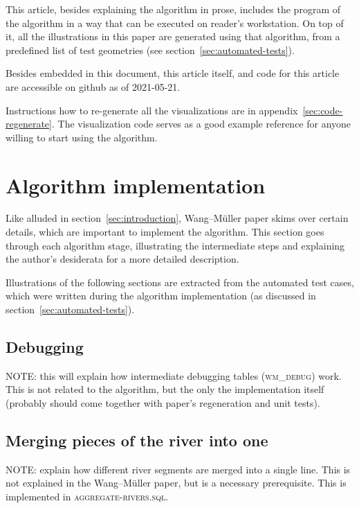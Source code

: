 \documentclass[a4paper]{article}
\newcommand{\WM}{Wang--M{\"u}ller}
\begin{document}
This article, besides explaining the algorithm in prose, includes the program
of the algorithm in a way that can be executed on reader's workstation. On top
of it, all the illustrations in this paper are generated using that algorithm,
from a predefined list of test geometries (see
section~\ref{sec:automated-tests}).

Besides embedded in this document, this article itself, and code for this
article are accessible on github as of 2021-05-21\cite{wmsql}.

Instructions how to re-generate all the visualizations are in
appendix~\ref{sec:code-regenerate}. The visualization code serves as a good
example reference for anyone willing to start using the algorithm.

\section{Algorithm implementation}

Like alluded in section~\ref{sec:introduction}, {\WM} paper skims over
certain details, which are important to implement the algorithm. This section
goes through each algorithm stage, illustrating the intermediate steps and
explaining the author's desiderata for a more detailed description.

Illustrations of the following sections are extracted from the automated test
cases, which were written during the algorithm implementation (as discussed in
section~\ref{sec:automated-tests}).

\subsection{Debugging}
\label{sec:debugging}


NOTE: this will explain how intermediate debugging tables (\textsc{wm\_debug})
work. This is not related to the algorithm, but the only the implementation
itself (probably should come together with paper's regeneration and unit
tests).

\subsection{Merging pieces of the river into one}


NOTE: explain how different river segments are merged into a single line. This
is not explained in the {\WM} paper, but is a necessary prerequisite. This is
implemented in \textsc{aggregate-rivers.sql}.
\end{document}
